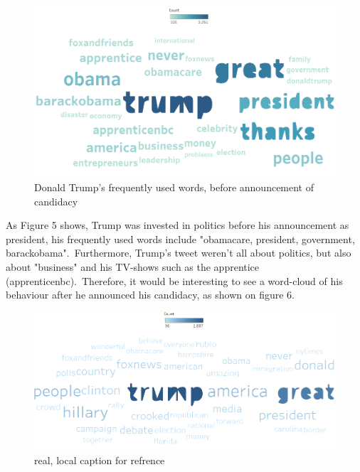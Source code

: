 \documentclass[12pt]{article}
\begin{document}
\begin{figure}[H] %
	\centering %
\includegraphics [scale= .45]  {TrumpBeforeAnnouncementWordFinal}    %
	\caption[Optional caption] {Donald Trump's frequently used words, before announcement of candidacy}
	\label{fig:wordcloudBliz}

\end{figure}

As Figure 5 shows, Trump was invested in politics before his announcement as president, his frequently used words include "obamacare, president, government, barackobama".\ Furthermore, Trump's tweet weren't all about politics, but also about "business" and his TV-shows such as the apprentice (apprenticenbc).\ Therefore, it would be interesting to see a word-cloud of his behaviour after he announced his candidacy, as shown on figure 6. 


\begin{figure}[H] %
	\centering %
\includegraphics [scale= .45]  {TrumpAfterAnnouncement}    %
	\caption[Optional caption] {real, local caption for refrence}
	\label{fig:wordcloudBliz}

\end{figure}
\end{document}
